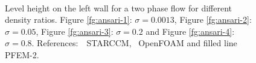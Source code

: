   \begin{figure}[h]
  \centering
     \\
   \caption{Level height on the left wall for a two phase flow for different density ratios. Figure \ref{fg:ansari-1}: $\sigma=0.0013$, Figure \ref{fg:ansari-2}: $\sigma=0.05$, Figure \ref{fg:ansari-3}: $\sigma=0.2$ and Figure \ref{fg:ansari-4}: $\sigma=0.8$. References:\ \Circle \ STARCCM, \Square \ OpenFOAM and filled line PFEM-2.}
   \label{fg:ansari-results}                %
\end{figure}

